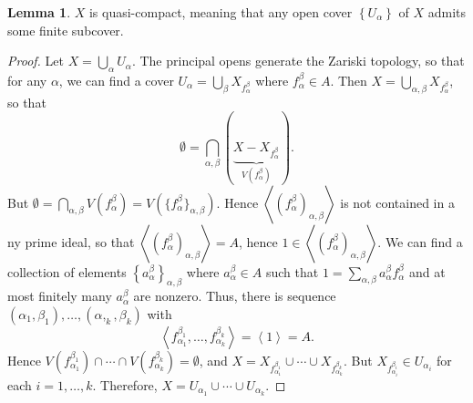 \documentclass[10pt,letterpaper,cm]{nupset}
\theoremstyle{definition}
\theoremstyle{theorem}
\newtheorem{lemma}[definition]{Lemma}
\theoremstyle{remark}
\newcommand{\1}{\mathbf{1}}
\newcommand{\0}{\vec 0}
\begin{document}
\medskip

\begin{lemma}
$X$ is quasi-compact, meaning that any open cover $\left\{U_{\alpha}\right\}$ of $X$ admits some finite subcover. 
\end{lemma}
\begin{proof}
Let $X = \bigcup_{\alpha} U_{\alpha}$. The principal opens generate the Zariski topology, so that for any $\alpha$, we can find a cover $U_{\alpha} = \bigcup_{\beta} X_{f_{\alpha}^{\beta}}$ where $f_{\alpha}^{\beta}\in A$. Then $X = \bigcup_{\alpha, \beta} X_{f_{\alpha}^{\beta}}$, so that $$\emptyset = \bigcap_{\alpha, \beta}(\underbrace{X - X_{f_{\alpha}^{\beta}}}_{V({f_{\alpha}^{\beta}})}).$$ But $\emptyset = \bigcap_{\alpha, \beta} V({f_{\alpha}^{\beta}})= V(\{ {f_{\alpha}^{\beta}} \}_{\alpha, \beta})$. Hence $\left\langle ({f_{\alpha}^{\beta}})_{\alpha, \beta} \right\rangle$ is not contained in a ny prime ideal, so that $\left\langle ({f_{\alpha}^{\beta}})_{\alpha, \beta} \right\rangle =A$, hence $1\in \left\langle ({f_{\alpha}^{\beta}})_{\alpha, \beta} \right\rangle$. We can find a collection of elements $\left\{a_{\alpha}^{\beta} \right\}_{\alpha, \beta}$ where $a_{\alpha}^{\beta} \in A$ such that $1= \sum_{\alpha, \beta} a_{\alpha}^{\beta} f_{\alpha}^{\beta}$ and at most finitely many $a_{\alpha}^{\beta}$ are nonzero. Thus, there is sequence $\left(\alpha_1, \beta_1\right), \ldots, \left(\alpha,_k , \beta_k\right)$ with $$\left\langle f_{\alpha_1}^{\beta_1}, \ldots, f_{\alpha_k}^{\beta_k} \right\rangle = \left\langle 1 \right\rangle = A.$$ Hence $V(f_{\alpha_1}^{\beta_1}) \cap \cdots \cap V(f_{\alpha_k}^{\beta_k}) = \emptyset$, and $X = X_{f_{\alpha_1}^{\beta_1}} \cup \cdots \cup X_{f_{\alpha_k}^{\beta_k}}$. But $X_{f_{\alpha_i}^{\beta_i}} \in U_{\alpha_i}$ for each $i=1, \ldots, k$. Therefore, $X= U_{\alpha_1} \cup \cdots \cup U_{\alpha_k}$.
\end{proof}
\end{document}
